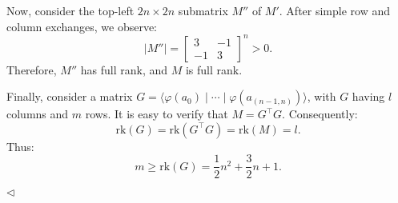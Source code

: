\documentclass[11pt]{article}
\newenvironment{answer}[1][Answer]{\begin{trivlist}
\item[\hskip \labelsep {\bfseries #1.}\hskip \labelsep]}{\hfill$\lhd$\end{trivlist}}
\begin{document}
\begin{answer}
Now, consider the top-left \( 2n \times 2n \) submatrix \( M'' \) of \( M' \). After simple row and column exchanges, we observe:
\[
|M''| = 
\begin{bmatrix}
    3 & -1 \\
    -1 & 3
\end{bmatrix}^n > 0.
\]
Therefore, \( M'' \) has full rank, and \( M \) is full rank.

Finally, consider a matrix \( G = \langle \varphi(a_0) \mid \cdots \mid \varphi(a_{(n-1,n)}) \rangle \), with \( G \) having \( l \) columns and \( m \) rows. It is easy to verify that \( M = G^\top G \). Consequently:
\[
\mathrm{rk}(G) = \mathrm{rk}(G^\top G) = \mathrm{rk}(M) = l.
\]
Thus:
\[
m \geq \mathrm{rk}(G) = \frac{1}{2}n^2 + \frac{3}{2}n + 1.
\]

\end{answer}
\end{document}
